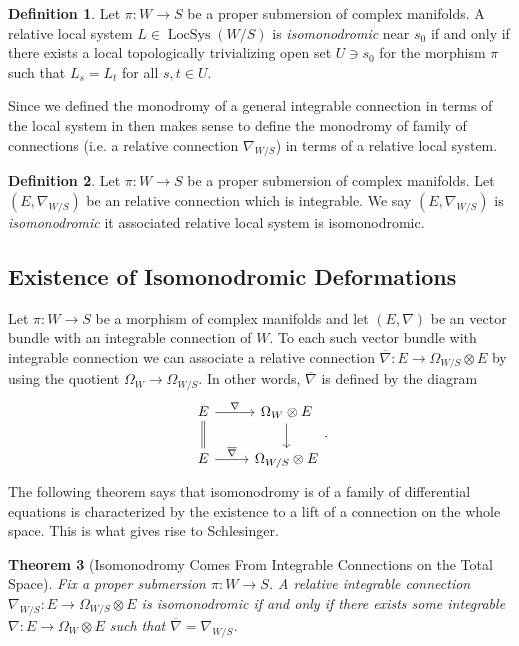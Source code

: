 \documentclass[12pt]{book}
\numberwithin{equation}{section}
\newtheorem{theorem}{Theorem}[subsection]
\theoremstyle{definition}
\newtheorem{definition}[theorem]{Definition}
\theoremstyle{remark}
\newcommand{\LocSys}{\operatorname{LocSys}}
\begin{document}
\begin{definition}
	Let $\pi: W\to S$ be a proper submersion of complex manifolds. 
	A relative local system $L \in \LocSys(W/S)$ is \emph{isomonodromic} near $s_0$ if and only if there exists a local topologically trivializing open set $U\owns s_0$ for the morphism $\pi$ such that $L_s = L_t$ for all $s,t\in U$. 
\end{definition}

Since we defined the monodromy of a general integrable connection in terms of the local system in then makes sense to define the monodromy of family of connections (i.e. a relative connection $\nabla_{W/S}$) in terms of a relative local system. 
\begin{definition}
	Let $\pi:W \to S$ be a proper submersion of complex manifolds. 
	Let $(E,\nabla_{W/S})$ be an relative connection which is integrable. 
	We say $(E,\nabla_{W/S})$ is \emph{isomonodromic} it associated relative local system is isomonodromic.
\end{definition}


\subsection{Existence of Isomonodromic Deformations}
Let $\pi: W\to S$ be a morphism of complex manifolds and let $(E,\nabla)$ be an vector bundle with an integrable connection of $W$.
To each such vector bundle with integrable connection we can associate a relative connection $\overline{\nabla}\colon E \to \Omega_{W/S} \otimes E$ by using the quotient $\Omega_{W} \to \Omega_{W/S}$. 
In other words, $\overline{\nabla}$ is defined by the diagram 
$$\begin{tikzcd}
E \ar[r, "\nabla"] \ar[d, equal] & \Omega_{W} \otimes E\ar[d] \\
E \ar[r,"\overline{\nabla}"] &  \Omega_{W/S}\otimes E
\end{tikzcd}.$$
The following theorem says that isomonodromy is of a family of differential equations is characterized by the existence to a lift of a connection on the whole space. 
This is what gives rise to Schlesinger. 
\begin{theorem}[Isomonodromy Comes From Integrable Connections on the Total Space]
	Fix a proper submersion $\pi: W\to S$. 
	A relative integrable connection $\nabla_{W/S}: E\to \Omega_{W/S}\otimes E$ is isomonodromic if and only if there exists some integrable $\nabla: E\to \Omega_W \otimes E$ such that $\overline{\nabla} = \nabla_{W/S}$.
\end{theorem}
\end{document}
